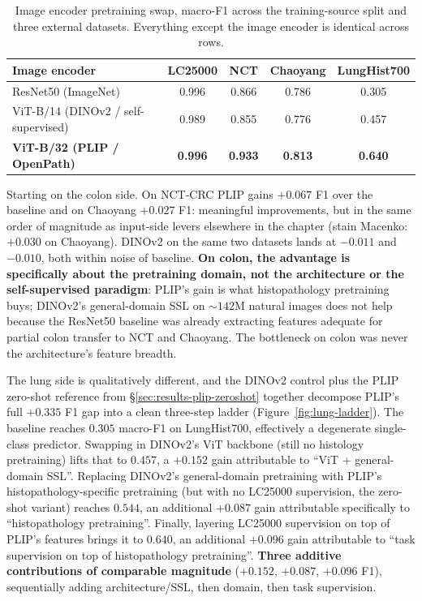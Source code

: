 \begin{table}[ht]
    \centering
    \small
    \begin{tabular}{|l|c|c|c|c|}
    \hline
    \textbf{Image encoder} & \textbf{LC25000} & \textbf{NCT} & \textbf{Chaoyang} & \textbf{LungHist700} \\ \hline
    ResNet50 (ImageNet)                              & 0.996 & 0.866 & 0.786 & 0.305 \\ \hline
    ViT-B/14 (DINOv2 / self-supervised)              & 0.989 & 0.855 & 0.776 & 0.457 \\ \hline
    \textbf{ViT-B/32 (PLIP / OpenPath)}              & \textbf{0.996} & \textbf{0.933} & \textbf{0.813} & \textbf{0.640} \\ \hline
    \end{tabular}
    \caption{Image encoder pretraining swap, macro-F1 across the training-source split and three external datasets. Everything except the image encoder is identical across rows.}
    \label{tab:image-encoder}
\end{table}

Starting on the colon side. On NCT-CRC PLIP gains $+0.067$ F1 over the baseline and on Chaoyang $+0.027$ F1: meaningful improvements, but in the same order of magnitude as input-side levers elsewhere in the chapter (stain Macenko: $+0.030$ on Chaoyang). DINOv2 on the same two datasets lands at $-0.011$ and $-0.010$, both within noise of baseline. \textbf{On colon, the advantage is specifically about the pretraining domain, not the architecture or the self-supervised paradigm}: PLIP's gain is what histopathology pretraining buys; DINOv2's general-domain SSL on $\sim 142$M natural images does not help because the ResNet50 baseline was already extracting features adequate for partial colon transfer to NCT and Chaoyang. The bottleneck on colon was never the architecture's feature breadth.

The lung side is qualitatively different, and the DINOv2 control plus the PLIP zero-shot reference from §\ref{sec:results-plip-zeroshot} together decompose PLIP's full $+0.335$ F1 gap into a clean three-step ladder (Figure~\ref{fig:lung-ladder}). The baseline reaches $0.305$ macro-F1 on LungHist700, effectively a degenerate single-class predictor. Swapping in DINOv2's ViT backbone (still no histology pretraining) lifts that to $0.457$, a $+0.152$ gain attributable to ``ViT + general-domain SSL''. Replacing DINOv2's general-domain pretraining with PLIP's histopathology-specific pretraining (but with no LC25000 supervision, the zero-shot variant) reaches $0.544$, an additional $+0.087$ gain attributable specifically to ``histopathology pretraining''. Finally, layering LC25000 supervision on top of PLIP's features brings it to $0.640$, an additional $+0.096$ gain attributable to ``task supervision on top of histopathology pretraining''. \textbf{Three additive contributions of comparable magnitude} ($+0.152$, $+0.087$, $+0.096$ F1), sequentially adding architecture/SSL, then domain, then task supervision.

